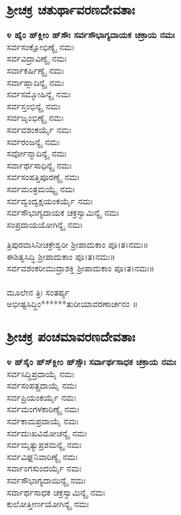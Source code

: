 \subsection{ಶ್ರೀಚಕ್ರ ಚತುರ್ಥಾವರಣದೇವತಾಃ}
{\bfseries ೪ ಹೈಂ ಹ್‌ಕ್ಲೀಂ ಹ್‌ಸೌಃ ಸರ್ವಸೌಭಾಗ್ಯದಾಯಕ ಚಕ್ರಾಯ ನಮಃ}\\
 ಸರ್ವಸಂಕ್ಷೋಭಿಣ್ಯೈ ನಮಃ\\
 ಸರ್ವವಿದ್ರಾವಿಣ್ಯೈ ನಮಃ\\
 ಸರ್ವಾಕರ್ಷಿಣ್ಯೈ ನಮಃ\\
 ಸರ್ವಾಹ್ಲಾದಿನ್ಯೈ ನಮಃ\\
 ಸರ್ವಸಮ್ಮೋಹಿನ್ಯೈ ನಮಃ\\
 ಸರ್ವಸ್ತಂಭಿನ್ಯೈ ನಮಃ\\
 ಸರ್ವಜೃಂಭಿಣ್ಯೈ ನಮಃ\\
 ಸರ್ವವಶಂಕರ್ಯೈ ನಮಃ\\
 ಸರ್ವರಂಜನ್ಯೈ ನಮಃ\\
 ಸರ್ವೋನ್ಮಾದಿನ್ಯೈ ನಮಃ\\
 ಸರ್ವಾರ್ಥಸಾಧಿನ್ಯೈ ನಮಃ\\
 ಸರ್ವಸಂಪತ್ತಿಪೂರಣ್ಯೈ ನಮಃ\\
 ಸರ್ವಮಂತ್ರಮಯ್ಯೈ ನಮಃ\\
 ಸರ್ವದ್ವಂದ್ವಕ್ಷಯಂಕರ್ಯೈ ನಮಃ\\
ಸರ್ವಸೌಭಾಗ್ಯದಾಯಕ ಚಕ್ರಸ್ವಾಮಿನ್ಯೈ ನಮಃ\\
ಸಂಪ್ರದಾಯಯೋಗಿನ್ಯೈ ನಮಃ

 ತ್ರಿಪುರವಾಸಿನೀಚಕ್ರೇಶ್ವರೀ ಶ್ರೀಪಾದುಕಾಂ ಪೂ।ತ।ನಮಃ॥\\
 ಈಶಿತ್ವಸಿದ್ಧಿ ಶ್ರೀಪಾದುಕಾಂ ಪೂ।ತ।ನಮಃ॥\\
 ಸರ್ವವಶಂಕರೀಮುದ್ರಾಶಕ್ತಿ ಶ್ರೀಪಾದುಕಾಂ ಪೂ।ತ।ನಮಃ॥\\
\\
ಮೂಲೇನ ತ್ರಿಃ ಸಂತರ್ಪ್ಯ\\
 ಅಭೀಷ್ಟಸಿದ್ಧಿಂ******ತುರೀಯಾವರಣಾರ್ಚನಂ ॥
\subsection{ಶ್ರೀಚಕ್ರ ಪಂಚಮಾವರಣದೇವತಾಃ}
{\bfseries ೪ ಹ್‌ಸೈಂ ಹ್‌ಸ್‌ಕ್ಲೀಂ ಹ್‌ಸ್ಸೌಃ ಸರ್ವಾರ್ಥಸಾಧಕ ಚಕ್ರಾಯ ನಮಃ}\\
 ಸರ್ವಸಿದ್ಧಿಪ್ರದಾಯೈ ನಮಃ\\
 ಸರ್ವಸಂಪತ್ಪ್ರದಾಯೈ ನಮಃ\\
 ಸರ್ವಪ್ರಿಯಂಕರ್ಯೈ ನಮಃ\\
 ಸರ್ವಮಂಗಳಕಾರಿಣ್ಯೈ ನಮಃ\\
 ಸರ್ವಕಾಮಪ್ರದಾಯೈ ನಮಃ\\
 ಸರ್ವದುಃಖವಿಮೋಚನ್ಯೈ ನಮಃ\\
 ಸರ್ವಮೃತ್ಯುಪ್ರಶಮನ್ಯೈ ನಮಃ\\
 ಸರ್ವವಿಘ್ನನಿವಾರಿಣ್ಯೈ ನಮಃ\\
 ಸರ್ವಾಂಗಸುಂದರ್ಯೈ ನಮಃ\\
 ಸರ್ವಸೌಭಾಗ್ಯದಾಯಿನ್ಯೈ ನಮಃ\\
 ಸರ್ವಾರ್ಥಸಾಧಕ ಚಕ್ರಸ್ವಾಮಿನ್ಯೈ ನಮಃ\\
ಕುಲೋತ್ತೀರ್ಣಯೋಗಿನ್ಯೈ ನಮಃ

